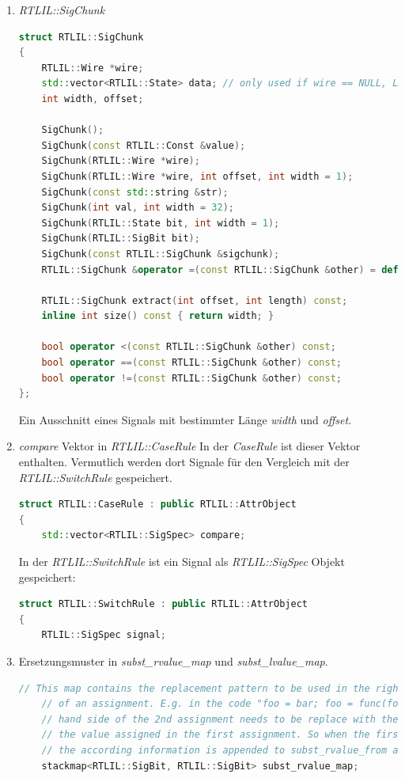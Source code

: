 \documentclass[11pt]{report}
\begin{document}
\begin{enumerate}
\item \textit{RTLIL::SigChunk}
\begin{lstlisting}[language=C++]
struct RTLIL::SigChunk
{
	RTLIL::Wire *wire;
	std::vector<RTLIL::State> data; // only used if wire == NULL, LSB at index 0
	int width, offset;

	SigChunk();
	SigChunk(const RTLIL::Const &value);
	SigChunk(RTLIL::Wire *wire);
	SigChunk(RTLIL::Wire *wire, int offset, int width = 1);
	SigChunk(const std::string &str);
	SigChunk(int val, int width = 32);
	SigChunk(RTLIL::State bit, int width = 1);
	SigChunk(RTLIL::SigBit bit);
	SigChunk(const RTLIL::SigChunk &sigchunk);
	RTLIL::SigChunk &operator =(const RTLIL::SigChunk &other) = default;

	RTLIL::SigChunk extract(int offset, int length) const;
	inline int size() const { return width; }

	bool operator <(const RTLIL::SigChunk &other) const;
	bool operator ==(const RTLIL::SigChunk &other) const;
	bool operator !=(const RTLIL::SigChunk &other) const;
};
\end{lstlisting}
Ein Ausschnitt eines Signals mit bestimmter Länge \textit{width} und \textit{offset}.
\item \textit{compare} Vektor in \textit{RTLIL::CaseRule}
In der \textit{CaseRule} ist dieser Vektor enthalten. Vermutlich werden dort Signale für den Vergleich mit der \textit{RTLIL::SwitchRule} gespeichert.
\begin{lstlisting}[language=C++]
struct RTLIL::CaseRule : public RTLIL::AttrObject
{
	std::vector<RTLIL::SigSpec> compare;
\end{lstlisting}
In der \textit{RTLIL::SwitchRule} ist ein Signal als \textit{RTLIL::SigSpec} Objekt gespeichert:
\begin{lstlisting}[language=C++]
struct RTLIL::SwitchRule : public RTLIL::AttrObject
{
	RTLIL::SigSpec signal;
\end{lstlisting}

\item Ersetzungsmuster in \textit{subst\_rvalue\_map} und \textit{subst\_lvalue\_map}.
\begin{lstlisting}[language=C++]
	// This map contains the replacement pattern to be used in the right hand side
	// of an assignment. E.g. in the code "foo = bar; foo = func(foo);" the foo in the right
	// hand side of the 2nd assignment needs to be replace with the temporary signal holding
	// the value assigned in the first assignment. So when the first assignment is processed
	// the according information is appended to subst_rvalue_from and subst_rvalue_to.
	stackmap<RTLIL::SigBit, RTLIL::SigBit> subst_rvalue_map;


\end{lstlisting}
\end{enumerate}
\end{document}
